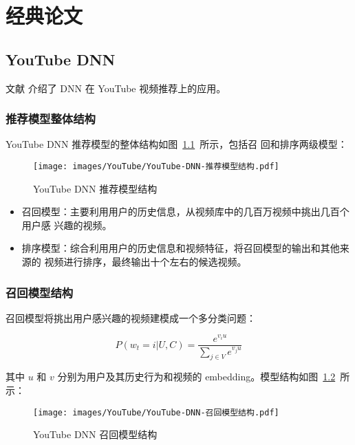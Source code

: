 \chapter{经典论文}
\section{YouTube DNN}

文献  介绍了 DNN 在 YouTube 视频推荐上的应用。

\subsection{推荐模型整体结构}
YouTube DNN 推荐模型的整体结构如图~\ref{fig:youtube-dnn-structure}~所示，包括召
回和排序两级模型：

\begin{figure}[ht]
  \centering
  \texttt{[image: images/YouTube/YouTube-DNN-推荐模型结构.pdf]}
  \caption{YouTube DNN 推荐模型结构}\label{fig:youtube-dnn-structure}
\end{figure}

\begin{itemize}
  \item 召回模型：主要利用用户的历史信息，从视频库中的几百万视频中挑出几百个用户感
    兴趣的视频。
  \item 排序模型：综合利用用户的历史信息和视频特征，将召回模型的输出和其他来源的
    视频进行排序，最终输出十个左右的候选视频。
\end{itemize}

\subsection{召回模型结构}
召回模型将挑出用户感兴趣的视频建模成一个多分类问题：

\begin{equation}
  P(w_t=i|U, C) = \frac{e^{v_i u}}{\sum_{j \in V} e^{v_j u}}
\end{equation}

其中 $u$ 和 $v$ 分别为用户及其历史行为和视频的 embedding。模型结构如图~\ref{fig:youtube-dnn-retrieval-structure}~所示：

\begin{figure}[ht]
  \centering
  \texttt{[image: images/YouTube/YouTube-DNN-召回模型结构.pdf]}
  \caption{YouTube DNN 召回模型结构}\label{fig:youtube-dnn-retrieval-structure}
\end{figure}

